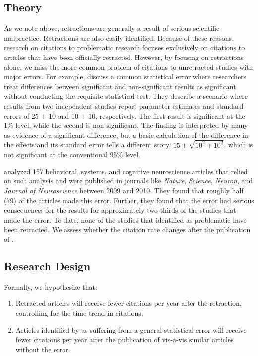 
\subsection{Theory}
As we note above, retractions are generally a result of serious scientific malpractice. Retractions are also easily identified. Because of these reasons, research on citations to problematic research focuses exclusively on citations to articles that have been officially retracted. However, by focusing on retractions alone, we miss the more common problem of citations to unretracted studies with major errors. For example, \citet{gelman2006} discuss a common statistical error where researchers treat differences between significant and non-significant results as significant without conducting the requisite statistical test. They describe a scenario where results from two independent studies report parameter estimates and standard errors of 25 $\pm$ 10 and 10 $\pm$ 10, respectively. The first result is significant at the 1\% level, while the second is non-significant. The finding is interpreted by many as evidence of a significant difference, but a basic calculation of the difference in the effects and its standard error tells a different story, $15 \pm \sqrt{10^{2} + 10^{2}}$, which is not significant at the conventional 95\% level.

\citet{nieuwenhuis2011} analyzed 157 behavioral, systems, and cognitive neuroscience articles that relied on such analysis and were published in journals like \textit{Nature}, \textit{Science}, \textit{Neuron}, and \textit{Journal of Neuroscience} between 2009 and 2010. They found that roughly half (79) of the articles made this error. Further, they found that the error had serious consequences for the results for approximately two-thirds of the studies that made the error. To date, none of the studies that \citet{nieuwenhuis2011} identified as problematic have been retracted. We assess whether the citation rate changes after the publication of \citet{nieuwenhuis2011}.
\subsection{Research Design}
Formally, we hypothesize that:
\begin{enumerate}
    \item Retracted articles will receive fewer citations per year after the retraction, controlling for the time trend in citations.
    \item Articles identified by \citet{nieuwenhuis2011} as suffering from a general statistical error will receive fewer citations per year after the publication of  \citet{nieuwenhuis2011} vis-a-vis similar articles without the error.
\end{enumerate}

